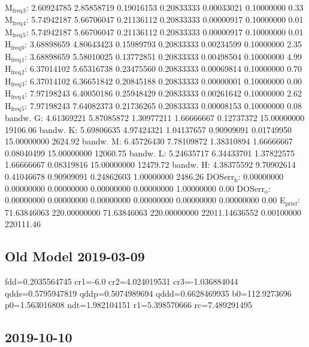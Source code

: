 \documentclass[11pt]{article}
\begin{document}
M\(_{\text{freq}}\)\(_{\text{3}}\):   2.60924785   2.85858719   0.19016153   0.20833333   0.00033021   0.10000000         0.33
M\(_{\text{freq}}\)\(_{\text{4}}\):   5.74942187   5.66706047   0.21136112   0.20833333   0.00000917   0.10000000         0.01
M\(_{\text{freq}}\)\(_{\text{5}}\):   5.74942187   5.66706047   0.21136112   0.20833333   0.00000917   0.10000000         0.01
H\(_{\text{freq}}\)\(_{\text{0}}\):   3.68898659   4.80643423   0.15989793   0.20833333   0.00234599   0.10000000         2.35
H\(_{\text{freq}}\)\(_{\text{1}}\):   3.68898659   5.58010025   0.13772851   0.20833333   0.00498504   0.10000000         4.99
H\(_{\text{freq}}\)\(_{\text{2}}\):   6.37014102   5.65316738   0.23475560   0.20833333   0.00069814   0.10000000         0.70
H\(_{\text{freq}}\)\(_{\text{3}}\):   6.37014102   6.36651842   0.20845188   0.20833333   0.00000001   0.10000000         0.00
H\(_{\text{freq}}\)\(_{\text{4}}\):   7.97198243   6.40050186   0.25948429   0.20833333   0.00261642   0.10000000         2.62
H\(_{\text{freq}}\)\(_{\text{5}}\):   7.97198243   7.64082373   0.21736265   0.20833333   0.00008153   0.10000000         0.08
bandw. G:   4.61369221   5.87085872   1.30977211   1.66666667   0.12737372  15.00000000     19106.06
bandw. K:   5.69806635   4.97424321   1.04137657   0.90909091   0.01749950  15.00000000      2624.92
bandw. M:   6.45726430   7.78109872   1.38310894   1.66666667   0.08040499  15.00000000     12060.75
bandw. L:   5.24635717   6.34433701   1.37822575   1.66666667   0.08319816  15.00000000     12479.72
bandw. H:   4.38375592   9.70902614   0.41046678   0.90909091   0.24862603   1.00000000      2486.26
DOSerr\(_{\text{h}}\):   0.00000000   0.00000000   0.00000000   0.00000000   0.00000000   1.00000000         0.00
DOSerr\(_{\text{o}}\):   0.00000000   0.00000000   0.00000000   0.00000000   0.00000000   0.00000000         0.00
E\(_{\text{pris}}\)\(_{\text{f}}\):  71.63846063 220.00000000  71.63846063 220.00000000 22011.14636552   0.00100000    220111.46

\subsection{Old Model 2019-03-09}
\label{sec:org2200e95}

fdd=0.2035564745 cr1=-6.0 cr2=4.024019531 cr3=-1.036884044 qdds=0.5795947819 qddp=0.5074989694 qddd=0.6628469935 b0=112.9273696 p0=1.563016808 ndt=1.982104151 r1=5.398570666 rc=7.489291495


\subsection{2019-10-10}
\label{sec:org75a7bba}
\end{document}
